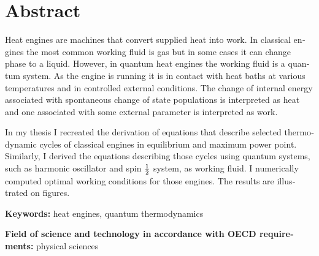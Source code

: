 \chapter*{Abstract}

\begin{otherlanguage}{english}

Heat engines are machines that convert supplied heat into work. In classical engines the most common working fluid is gas but in some cases it can change phase to a liquid. However, in quantum heat engines the working fluid is a quantum system. As the engine is running it is in contact with heat baths at various temperatures and in controlled external conditions. The change of internal energy associated with spontaneous change of state populations is interpreted as heat and one associated with some external parameter is interpreted as work.

In my thesis I recreated the derivation of equations that describe selected thermodynamic cycles of classical engines in equilibrium and maximum power point. Similarly, I derived the equations describing those cycles using quantum systems, such as harmonic oscillator and spin \(\frac{1}{2}\) system, as working fluid. I numerically computed optimal working conditions for those engines. The results are illustrated on figures.




\bigskip
\noindent
\textbf{Keywords:} heat engines, quantum thermodynamics

\bigskip
\noindent
\textbf{Field of science and technology in accordance with OECD
requirements:} physical sciences

\end{otherlanguage}

